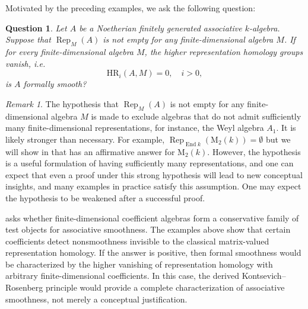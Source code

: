 \documentclass{article}
\numberwithin{equation}{section} %
\theoremstyle{plain}
\newtheorem{question}{Question}
\theoremstyle{definition}
\theoremstyle{remark}
\newtheorem{remark}{Remark}
\begin{document}
Motivated by the preceding examples, we ask the following question:

\begin{question}\label{ques}
Let $A$ be a Noetherian finitely generated associative $k$-algebra.
Suppose that $\operatorname{Rep}_M(A)$ is not empty for any finite-dimensional algebra $M$.
If for \emph{every} finite-dimensional algebra $M$, the higher representation homology groups vanish, i.e.
\begin{equation*}
\mathrm{HR}_i(A,M)=0,\quad i>0,
\end{equation*}
is $A$ formally smooth?
\end{question}


\begin{remark}
The hypothesis that $\operatorname{Rep}_M(A)$ is not empty for any finite-dimensional algebra $M$ is made to exclude algebras that do not admit sufficiently many finite-dimensional representations, for instance, the Weyl algebra $A_1$.
It is likely stronger than necessary.
For example, $\operatorname{Rep}_{\operatorname{End}k}(\mathrm{M}_2(k))=\emptyset$ but we will show in  that  has an affirmative answer for $\mathrm{M}_2(k)$.
However, the hypothesis is a useful formulation of having sufficiently many representations, and one can expect that even a proof under this strong hypothesis will lead to new conceptual insights, and many examples in practice satisfy this assumption.
One may expect the hypothesis to be weakened after a successful proof.
\end{remark}

 asks whether finite-dimensional coefficient algebras form a conservative family of test objects for associative smoothness.
The examples above show that certain coefficients detect nonsmoothness invisible to the classical matrix-valued representation homology.
If the answer is positive, then formal smoothness would be characterized by the higher vanishing of representation homology with arbitrary finite-dimensional coefficients.
In this case, the derived Kontsevich–Rosenberg principle would provide a complete characterization of associative smoothness, not merely a conceptual justification.
\end{document}
